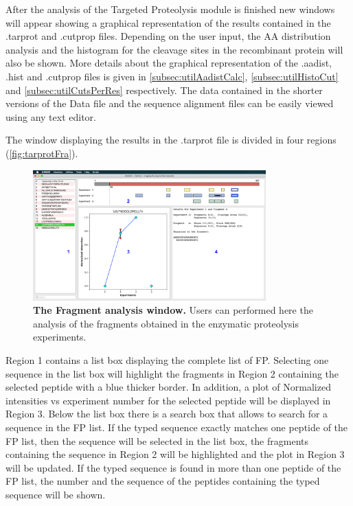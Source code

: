 After the analysis of the Targeted Proteolysis module is finished new windows will appear showing a graphical representation of the results contained in the .tarprot and .cutprop files. Depending on the user input, the AA distribution analysis and the histogram for the cleavage sites in the recombinant protein will also be shown. More details about the graphical representation of the .aadist, .hist and .cutprop files is given in \autoref{subsec:utilAadistCalc}, \autoref{subsec:utilHistoCut} and \autoref{subsec:utilCutsPerRes} respectively. The data contained in the shorter versions of the Data file and the sequence alignment files can be easily viewed using any text editor.   

The window displaying the results in the .tarprot file is divided in four regions (\autoref{fig:tarprotFra}).

\begin{figure}[h]
	\centering
	\includegraphics[width=0.8\textwidth]{./IMAGES/MOD-TARPROT/tarprot-frag.jpg}	    
	\caption[The Fragment analysis window]{\textbf{The Fragment analysis window.} Users can performed here the analysis of the fragments obtained in the enzymatic proteolysis experiments.} 
	\label{fig:tarprotFra}
	\vspace{-5pt} 	
\end{figure} 

Region \num{1} contains a list box displaying the complete list of FP. Selecting one sequence in the list box will highlight the fragments in Region \num{2} containing the selected peptide with a blue thicker border. In addition, a plot of Normalized intensities vs experiment number for the selected peptide will be displayed in Region \num{3}. Below the list box there is a search box that allows to search for a sequence in the FP list. If the typed sequence exactly matches one peptide of the FP list, then the sequence will be selected in the list box, the fragments containing the sequence in Region \num{2} will be highlighted and the plot in Region \num{3} will be updated. If the typed sequence is found in more than one peptide of the FP list, the number and the sequence of the peptides containing the typed sequence will be shown.


